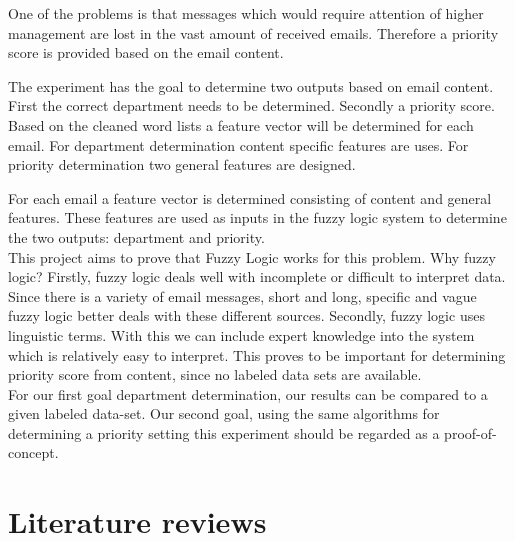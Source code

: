 \documentclass[journal]{IEEEtran}
\begin{document}
One of the problems is that messages which would require attention of higher management are lost in the vast amount of received emails. Therefore a priority score is provided based on the email content.


The experiment has the goal to determine two outputs based on email content. First the correct department needs to be determined. Secondly a priority score. Based on the cleaned word lists a feature vector will be determined for each email. For department determination content specific features are uses. For priority determination two general features are designed.

For each email a feature vector is determined consisting of content and general features. These features are used as inputs in the fuzzy logic system to determine the two outputs: department and priority. \\

This project aims to prove that Fuzzy Logic works for this problem. Why fuzzy logic? Firstly, fuzzy logic deals well with incomplete or difficult to interpret data. Since there is a variety of email messages, short and long, specific and vague fuzzy logic better deals with these different sources. Secondly, fuzzy logic uses linguistic terms. With this we can include expert knowledge into the system which is relatively easy to interpret. This proves to be important for determining priority score from content, since no labeled data sets are available.\\

For our first goal department determination, our results can be compared to a given labeled data-set. Our second goal, using the same algorithms for determining a priority setting this experiment should be regarded as a proof-of-concept.

\section{Literature reviews}
\end{document}
